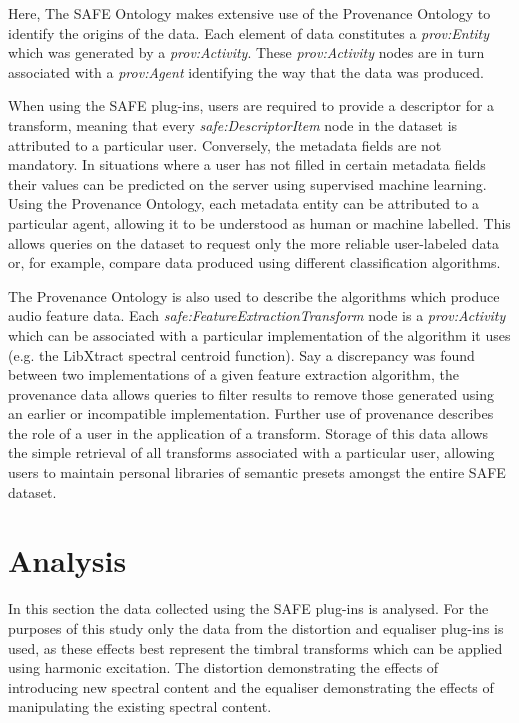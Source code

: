 		Here, The SAFE Ontology makes extensive use of the Provenance Ontology to identify the origins of the data.
		Each element of data constitutes a \emph{prov:Entity} which was generated by a \emph{prov:Activity}. These
		\emph{prov:Activity} nodes are in turn associated with a \emph{prov:Agent} identifying the way that the
		data was produced.

		When using the SAFE plug-ins, users are required to provide a descriptor for a transform, meaning that
		every \emph{safe:DescriptorItem} node in the dataset is attributed to a particular user. Conversely, the
		metadata fields are not mandatory. In situations where a user has not filled in certain metadata fields
		their values can be predicted on the server using supervised machine learning. Using the Provenance
		Ontology, each metadata entity can be attributed to a particular agent, allowing it to be understood as
		human or machine labelled. This allows queries on the dataset to request only the more reliable
		user-labeled data or, for example, compare data produced using different classification algorithms.

		The Provenance Ontology is also used to describe the algorithms which produce audio feature data. Each
		\emph{safe:FeatureExtractionTransform} node is a \emph{prov:Activity} which can be associated with a
		particular implementation of the algorithm it uses (e.g. the LibXtract \citep{bullock2007libxtract}
		spectral centroid function). Say a discrepancy was found between two implementations of a given feature
		extraction algorithm, the provenance data allows queries to filter results to remove those generated using
		an earlier or incompatible implementation. Further use of provenance describes the role of a user in the
		application of a transform. Storage of this data allows the simple retrieval of all transforms associated
		with a particular user, allowing users to maintain personal libraries of semantic presets amongst the
		entire SAFE dataset.

\section{Analysis}
\label{sec:TimbreEvaluation-Analysis}
	In this section the data collected using the SAFE plug-ins is analysed. For the purposes of this study only the
	data from the distortion and equaliser plug-ins is used, as these effects best represent the timbral transforms
	which can be applied using harmonic excitation. The distortion demonstrating the effects of introducing new
	spectral content and the equaliser demonstrating the effects of manipulating the existing spectral content.

